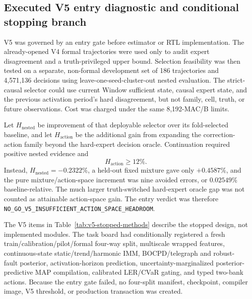 \documentclass[11pt]{article}
\begin{document}
\subsection{Executed V5 entry diagnostic and conditional stopping branch}

V5 was governed by an entry gate before estimator or RTL implementation.  The
already-opened V4 formal trajectories were used only to audit expert
disagreement and a truth-privileged upper bound.  Selection feasibility was
then tested on a separate, non-formal development set of 186 trajectories and
4,571,136 decisions using leave-one-seed-cluster-out nested evaluation.  The
strict-causal selector could use current Window sufficient state, causal expert
state, and the previous activation period's hard disagreement, but not family,
cell, truth, or future observations.  Cost was charged under the same
8,192-MAC/B limits.

Let $H_{\mathrm{nested}}$ be improvement of that deployable selector over its
fold-selected baseline, and let $H_{\mathrm{action}}$ be the additional gain
from expanding the correction-action family beyond the hard-expert decision
oracle.  Continuation required positive nested evidence and
\begin{equation}
  H_{\mathrm{action}}\ge 12\%.
\end{equation}
Instead, $H_{\mathrm{nested}}=-0.2322\%$, a held-out fixed mixture gave only
$+0.4587\%$, and the pure mixture/action-space increment was nine avoided
errors, or $0.02549\%$ baseline-relative.  The much larger truth-switched
hard-expert oracle gap was not counted as attainable action-space gain.  The
entry verdict was therefore
\texttt{NO\_GO\_V5\_INSUFFICIENT\_ACTION\_SPACE\_HEADROOM}.

The V5 items in Table~\ref{tab:v5-stopped-methods} describe the stopped design,
not implemented modules.  The task board had conditionally registered a fresh
train/calibration/pilot/formal four-way split, multiscale wrapped features,
continuous-state static/trend/harmonic IMM, BOCPD/telegraph and robust-fault
posterior, activation-horizon prediction, uncertainty-marginalized
posterior-predictive MAP compilation, calibrated LER/CVaR gating, and typed
two-bank actions.  Because the entry gate failed, no four-split manifest,
checkpoint, compiler image, V5 threshold, or production transaction was
created.
\end{document}
